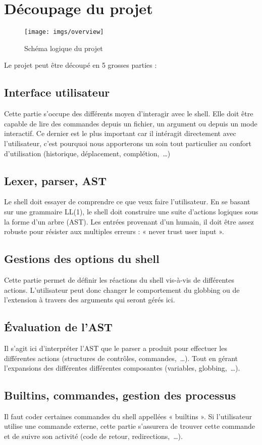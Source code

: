 \section{Découpage du projet}
\begin{sidewaysfigure}[ftbp]
    \texttt{[image: imgs/overview]}
    \caption{Schéma logique du projet}
\end{sidewaysfigure}

Le projet peut être découpé en 5 grosses parties :
\subsection{Interface utilisateur}

Cette partie s'occupe des différents moyen d'interagir avec le shell. Elle doit
être capable de lire des commandes depuis un fichier, un argument ou depuis un
mode interactif. Ce dernier est le plus important car il intéragit directement
avec l'utilisateur, c'est pourquoi nous apporterons un soin tout particulier au
confort d'utilisation (historique, déplacement, complétion,~\dots)

\subsection{Lexer, parser, AST}

Le shell doit essayer de comprendre ce que veux faire l'utilisateur. En se
basant sur une grammaire LL(1), le shell doit construire une suite d'actions
logiques sous la forme d'un arbre (AST). Les entrées provenant d'un humain, il
doit être assez robuste pour résister aux multiples erreurs : « never trust
user input ».

\subsection{Gestions des options du shell}

Cette partie permet de définir les réactions du shell vis-à-vis de différentes
actions. L'utilisateur peut donc changer le comportement du globbing ou de
l'extension à travers des arguments qui seront gérés ici.

\subsection{Évaluation de l'AST}

Il s'agit ici d'interpréter l'AST que le parser a produit pour effectuer les
différentes actions (structures de contrôles, commandes,~\dots). Tout en gérant
l'expansions des différentes différentes composantes (variables,
globbing,~\dots).

\subsection{Builtins, commandes, gestion des processus}

Il faut coder certaines commandes du shell appellées « builtins ». Si
l'utilisateur utilise une commande externe, cette partie s'assurera de trouver
cette commande et de suivre son activité (code de retour, redirections,~\dots).
